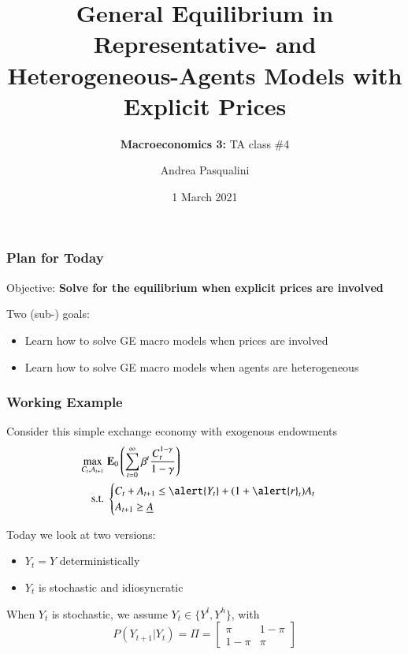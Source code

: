 \documentclass[10pt, aspectratio=1610, natbib, handout]{beamer}
\title[GE with Prices]{
  \textbf{General Equilibrium in Representative- and Heterogeneous-Agents Models with Explicit Prices}
}
\subtitle[Macro 3: TA\#4]{
  \textbf{Macroeconomics 3:} TA class \#4
}
\author[A.~Pasqualini]{
  Andrea Pasqualini
}
\institute[Bocconi]{Bocconi University}
\date{
  1 March 2021
}
\begin{document}
  \begin{frame}
    \maketitle
  \end{frame}

  \begin{frame}
    \frametitle{Plan for Today}

    Objective: \textbf{Solve for the equilibrium when explicit prices are involved}

    \vfill\pause

    Two (sub-) goals:
    \begin{itemize}
      \item Learn how to solve GE macro models when prices are involved
      \item Learn how to solve GE macro models when agents are heterogeneous
    \end{itemize}

  \end{frame}

  \begin{frame}
    \frametitle{Working Example}

    Consider this simple exchange economy with exogenous endowments
    \begin{align*}
      \max_{C_t, A_{t+1}} &\; \E_0 \left( \sum_{t=0}^{\infty} \beta^t \frac{C_t^{1-\gamma}}{1-\gamma} \right) \\
      \text{s.t.} &\;
      \begin{cases}
        C_t + A_{t+1} \leq \alert{Y_t} + (1 + \alert{r}_t) A_t \\
        A_{t+1} \geq \underline{A}
      \end{cases}
    \end{align*}

    \vfill\pause

    Today we look at two versions:
    \begin{itemize}
      \item $Y_t = Y$ deterministically \hfill{}
      \item $Y_t$ is stochastic and idiosyncratic \hfill{}
    \end{itemize}

    \vfill\pause

    When $Y_t$ is stochastic, we assume $Y_t \in \{ Y^l, Y^h \}$, with
    \begin{equation*}
      P(Y_{t+1} | Y_t) = \Pi =
      \begin{bmatrix}
        \pi & 1 - \pi \\
        1 - \pi & \pi
      \end{bmatrix}
    \end{equation*}

  \end{frame}
\end{document}
